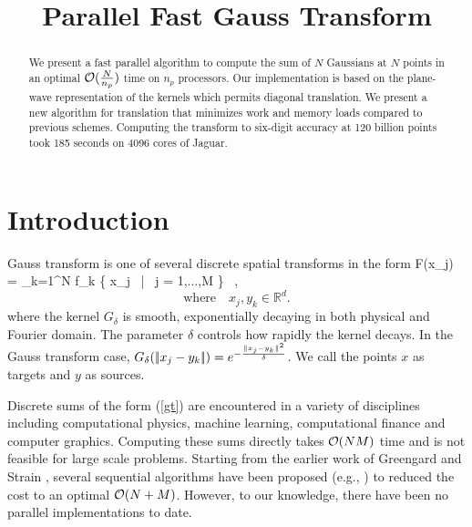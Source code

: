 \documentclass[conference]{IEEEtran}
\begin{document}
\title{Parallel Fast Gauss Transform}  


\author{

\and
{}

\and
{}
}
\date{}
\maketitle

\begin{abstract}
We present a fast parallel algorithm to compute the sum of $N$ Gaussians at $N$ points in an optimal $\mathcal{O}(\frac{N}{n_p})$ time on $n_p$ processors. Our implementation is based on the plane-wave representation of the kernels which permits diagonal translation. We present a new algorithm for translation that minimizes work and memory loads compared to previous schemes.
Computing the transform to six-digit accuracy at 120 billion points took 185 seconds on 4096 cores of Jaguar. 
\end{abstract}

\section{Introduction}  \label{s:intro}
Gauss transform is one of several discrete spatial transforms in the form 
%
\beq F(x_j) = \sum_{k=1}^N  f_k \quad {} \quad \{ x_j \, | \, j = 1,...,M \} \, , \label{gt} \eeq
\[\text{where} \quad x_j, y_k \in \mathbb{R}^d. \]
%
where the kernel $G_\delta$ is smooth, exponentially decaying in both physical and Fourier domain. The parameter $\delta$ controls how rapidly the kernel decays.  
In the Gauss transform case, $G_\delta (|\!| x_j - y_k |\!|) = e^{-\frac{\|x_j - y_k\|^2}{\delta}}$.  We call the points $x$ as targets and $y$ as sources.  

Discrete sums of the form (\ref{gt}) are encountered in a variety of disciplines including computational physics, machine learning, computational finance and computer graphics. Computing these sums directly takes $\mathcal{O}(NM)$ time and is not feasible for large scale problems. Starting from the earlier work of Greengard and Strain \cite{fgt}, several sequential algorithms have been proposed (e.g.,  \cite{greengard98, duraiswami03, fggt}) to reduced the cost to an optimal $\mathcal{O}(N+M)$. However, to our knowledge, there have been no parallel implementations to date. 
\end{document}
